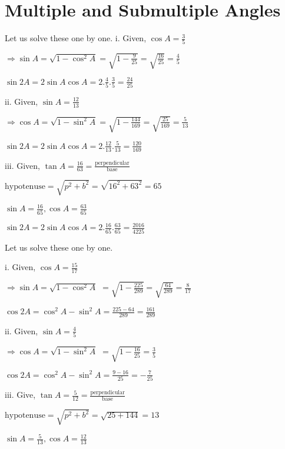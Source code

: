 \chapter{Multiple and Submultiple Angles}
\startitemize[n, 1*broad]
\item Let us solve these one by one.
  \startitemize[i]
    i. Given, $\cos A = \frac{3}{5}$

    $\Rightarrow \sin A = \sqrt{1 - \cos^2A} = \sqrt{1 - \frac{9}{25}} = \sqrt{\frac{16}{25}} = \frac{4}{5}$

    $\sin 2A = 2\sin A\cos A = 2.\frac{4}{5}.\frac{3}{5} = \frac{24}{25}$

    ii. Given, $\sin A = \frac{12}{13}$

    $\Rightarrow \cos A = \sqrt{1 - \sin^2A} = \sqrt{1 - \frac{144}{169}} = \sqrt{\frac{25}{169}} = \frac{5}{13}$

    $\sin 2A = 2\sin A\cos A = 2.\frac{12}{13}.\frac{5}{13} = \frac{120}{169}$

    iii. Given, $\tan A = \frac{16}{63} = \frac{\text{perpendicular}}{\text{base}}$

    $\text{hypotenuse} = \sqrt{p^2 + b^2} = \sqrt{16^2 + 63^2} = 65$

    $\sin A = \frac{16}{65}, \cos A = \frac{63}{65}$

    $\sin 2A = 2\sin A\cos A = 2.\frac{16}{65}.\frac{63}{65} = \frac{2016}{4225}$
  \stopitemize
\item Let us solve these one by one.
  \startitemize[i]

    i. Given, $\cos A = \frac{15}{17}$

    $\Rightarrow \sin A = \sqrt{1 - \cos^2A}$ $= \sqrt{1 - \frac{225}{289}} = \sqrt{\frac{64}{289}} = \frac{8}{17}$

    $\cos 2A = \cos^2A - \sin^2A = \frac{225 - 64}{289} = \frac{161}{289}$

    ii. Given, $\sin A = \frac{4}{5}$

    $\Rightarrow \cos A = \sqrt{1 - \sin^2A}$ $= \sqrt{1 - \frac{16}{25}} = \frac{3}{5}$

    $\cos2A = \cos^2A - \sin^2A = \frac{9 - 16}{25} = -\frac{7}{25}$

    iii. Give, $\tan A = \frac{5}{12} = \frac{\text{perpendicular}}{\text{base}}$

    $\text{hypotenuse} = \sqrt{p^2 + b^2} = \sqrt{25 + 144} = 13$

    $\sin A = \frac{5}{13}, \cos A = \frac{12}{13}$

